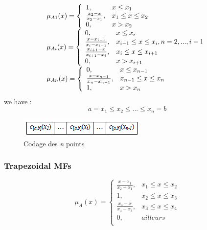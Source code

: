 \documentclass[runningheads,a4paper]{llncs}
\begin{document}
\begin{equation} 
\begin{tabular}{l}
$\mu_{A1}(x) =  \left \{
\begin{array}{ll}   %
1,& x \leq x_{1}\\
\frac{x_{2} - x}{x_{2} - x_{1}},& x_{1} \leq x \leq x_{2}\\
0        , &x > x_{2}
\end{array} 
\right. $	\\
$\mu_{Ai}(x)= \left \{
\begin{array}{ll}
0, &x \leq x_{i}\\
\frac{x - x_{i-1}}{x_{i} - x_{i-1}},& x_{i-1} \leq x \leq x_{i},n=2,...,i-1\\
\frac{x_{i+1} - x}{x_{i+1} - x_{i}}, & x_{i} \leq x \leq x_{i+1}\\
0        , &x > x_{i+1}
\end{array}
\right.	$	\\		
$\mu_{An}(x)= \left \{
\begin{array}{ll}
0, &x \leq x_{n-1}\\
\frac{x - x_{n-1}}{x_{n} - x_{n-1}},& x_{n-1} \leq x \leq x_{n}\\
1        , &x > x_{n}\\
\end{array}
\right.$
\end{tabular}
\end{equation}
we have :
\[ \textit{a} = x_{1} \leq x_{2} \leq ...\leq x_{n} = \textit{b} \]
\begin{figure}[!ht] 
	\begin{center}
		\includegraphics[scale=0.95]{fig/cotr}
		\caption {Codage des \textit{n} points}
		\label{cotr}
	\end{center}
\end{figure}
\subsubsection{Trapezoidal MFs}

\begin{equation}
\mu_{A}(x)= \left \{
\begin{array}{ll}
\frac{x - x_{1}}{x_{2} - x_{1}},& x_{1} \leq x \leq x_{2}\\
1 , &x_{2} \leq x \leq x_{3}\\
\frac{x_{4} - x}{x_{4} - x_{3}},& x_{3} \leq x \leq x_{4}\\
0        ,& ailleurs\\	
\end{array}
\right.
\end{equation}
																																																																																																																																																																																																																																																																																																																																																												
\end{document}
